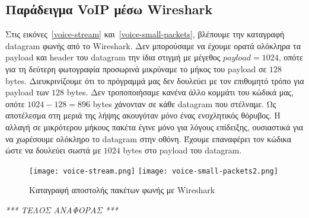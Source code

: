 \documentclass{article}
\begin{document}
\subsection{Παράδειγμα VoIP μέσω Wireshark}
Στις εικόνες~\ref{voice-stream} και~\ref{voice-small-packets}, βλέπουμε την καταγραφή datagram φωνής από το Wireshark.
Δεν μπορούσαμε να έχουμε ορατά ολόκληρα τα payload και header του datagram την ίδια στιγμή με μέγεθος $payload = 1024$,
οπότε για τη δεύτερη φωτογραφία προσωρινά μικρύναμε το μήκος του payload σε $128$ bytes. Διευκρινίζουμε ότι το 
πρόγραμμά μας δεν δουλεύει με τον επιθυμητό τρόπο για payload των $128$ bytes. Δεν τροποποιήσαμε κανένα
άλλο κομμάτι του κώδικά μας, οπότε $1024 - 128 = 896$ bytes χάνονταν σε κάθε datagram που στέλναμε.
Ως αποτέλεσμα στη μεριά της λήψης ακουγόταν μόνο ένας ενοχλητικός θόρυβος. Η αλλαγή σε μικρότερου μήκους πακέτα 
έγινε μόνο για λόγους επίδειξης, ουσιαστικά για να χωρέσουμε ολόκληρο το datagram στην οθόνη.
Έχουμε επαναφέρει τον κώδικα ώστε να δουλεύει σωστά με $1024$ bytes στο payload του datagram.


\begin{figure}%
    \centering
    {\texttt{[image: voice-stream.png]}}
    {\texttt{[image: voice-small-packets2.png]}}
    \caption{Καταγραφή αποστολής πακέτων φωνής με Wireshark}
\end{figure}
\newpage
\centering
\emph{*** ΤΕΛΟΣ ΑΝΑΦΟΡΑΣ ***}
\end{document}
